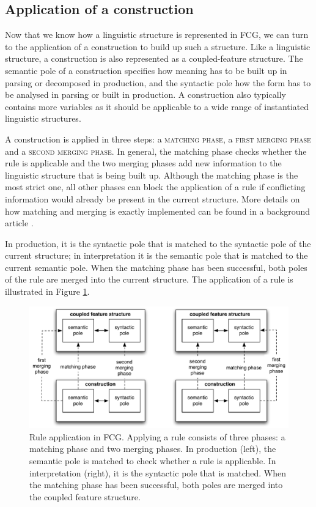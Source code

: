 \subsection{Application of a construction}

Now that we know how a linguistic structure is represented in FCG, we
can turn to the application of a construction to build up such a
structure. Like a linguistic structure, a construction is also
represented as a coupled-feature structure. The semantic pole of a
construction specifies how meaning has to be built up in parsing or
decomposed in production, and the syntactic pole how the form has to
be analysed in parsing or built in production. A construction also
typically contains more variables as it should be applicable to a wide
range of instantiated linguistic structures.

A construction is applied in three steps: a \textsc{matching phase}, a
\textsc{first merging phase} and a \textsc{second merging phase}. In
general, the matching phase checks whether the rule is applicable and
the two merging phases add new information to the linguistic structure
that is being built up. Although the matching phase is the most strict
one, all other phases can block the application of a rule if
conflicting information would already be present in the current
structure. More details on how matching and merging is exactly
implemented can be found in a background article
\citep{steels06unify}.

In production, it is the syntactic pole that is matched to the
syntactic pole of the current structure; in interpretation it is the
semantic pole that is matched to the current semantic pole. When the
matching phase has been successful, both poles of the rule are merged
into the current structure. The application of a rule is illustrated
in Figure \ref{f:fcg-rule-application}.

\begin{figure}[htb]
  \begin{center}
    \includegraphics[width=\textwidth]{./frameworks/figures/fcg-rule-application.pdf}
    \caption[Application of a rule]{Rule application in FCG. Applying
      a rule consists of three phases: a matching phase and two
      merging phases. In production (left), the semantic pole is
      matched to check whether a rule is applicable. In interpretation
      (right), it is the syntactic pole that is matched. When the
      matching phase has been successful, both poles are merged into
      the coupled feature structure.}
    \label{f:fcg-rule-application}
  \end{center}
\end{figure}

